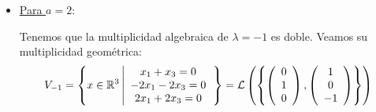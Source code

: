 \documentclass[12pt]{article}
\begin{document}
\begin{ejercicio} [6 ptos]
\begin{enumerate}
\begin{itemize}
                Tenemos que la multiplicidad algebraica de $\lambda = \frac{1}{2}$ es doble. Veamos su multiplicidad geométrica:
                \begin{equation*}
                    V_{\frac{1}{2}} = \left\{x\in\bb{R}^3 \left| \begin{array}{c}
                         -\frac{1}{2}x_1+x_3=0  \\
                         -\frac{1}{2}x_1-\frac{1}{2}x_3=0 \\
                         \frac{1}{2}x_1-x_3=0
                    \end{array}\right.\right\} = \mathcal{L}\left(\left\{ \left(\begin{array}{c}
                            0 \\
                            1 \\
                            0 \\
                       \end{array}\right)
                       \right\}\right)
                \end{equation*}

                Por tanto, como la multiplicidad geométrica es distinta a la algebraica $(1\neq 2)$, tenemos que no es diagonalizable.


                \item \underline{Para $a=2$}:

                Tenemos que la multiplicidad algebraica de $\lambda = -1$ es doble. Veamos su multiplicidad geométrica:
                \begin{equation*}
                    V_{-1} = \left\{x\in\mathbb{R}^3 \left| \begin{array}{c}
                         x_1+x_3=0  \\
                         -2x_1-2x_3=0 \\
                         2x_1+2x_3=0
                    \end{array}\right.\right\} = \mathcal{L}\left(\left\{ \left(\begin{array}{c}
                            0 \\
                            1 \\
                            0 \\
                       \end{array}\right),
                       \left(\begin{array}{c}
                            1 \\
                            0 \\
                            -1 \\
                       \end{array}\right)
                       \right\}\right)
                \end{equation*}


\end{itemize}
\end{enumerate}
\end{ejercicio}
\end{document}
